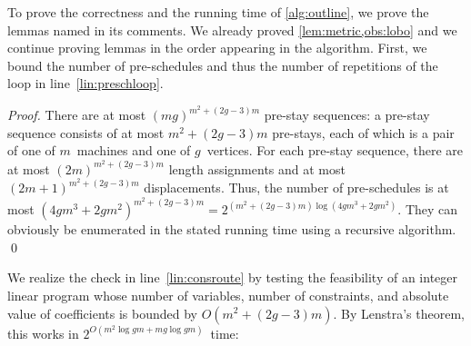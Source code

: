 \documentclass[natbib,sort,smallextended,envcountsame,envcountsect,numbook]{svjour3}
\newcommand{\bigO}{O}
\def\totstays{\ensuremath{{m^2+(2g-3)m}}}
\begin{document}
\noindent
To prove the correctness and the running time of \cref{alg:outline},
we prove the lemmas named in its comments.
We already proved \cref{lem:metric,obs:lobo}
and we continue proving lemmas in the order appearing in the algorithm.
First,
we bound the number of pre-schedules
and thus
the number of repetitions of the loop in line~\ref{lin:preschloop}.

\begin{proof}
  There are at most \((mg)^\totstays\) pre-stay sequences:
  a pre-stay sequence consists of at most \(\totstays\) pre-stays,
  each of which is a pair of one of \(m\)~machines and one of \(g\)~vertices.
  For each pre-stay sequence, there are at most \((2m)^\totstays\) length assignments
and at most \((2m+1)^\totstays\) displacements.
Thus, the number  of pre-schedules is at most
\((4gm^3+2gm^2)^\totstays=2^{(\totstays)\log (4gm^3+2gm^2)}\).
They can obviously be enumerated in the stated running time
using a recursive algorithm.
  \qed
\end{proof}

\noindent
We realize the check in line~\ref{lin:consroute}
by testing
the feasibility of an integer linear program
whose number of variables, number of constraints, and
absolute value of coefficients is bounded by
\(\bigO(\totstays)\).
By Lenstra's theorem, this works in \(2^{O(m^2\log gm+mg\log gm)}\)~time:
\end{document}
